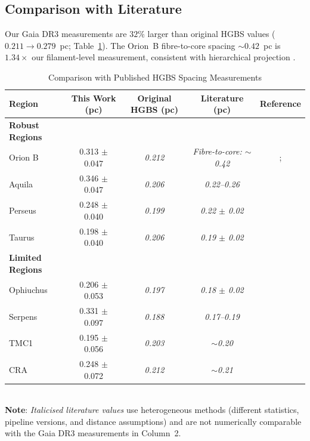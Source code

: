 \documentclass[twoside,twocolumn]{mnras}
\begin{document}
\subsection{Comparison with Literature}

Our Gaia DR3 measurements are $32\%$ larger than original HGBS values ($0.211 \to 0.279$~pc; Table~\ref{tab:literature}). The Orion~B fibre-to-core spacing ${\sim}0.42$~pc \citep{Yang2024} is $1.34\times$ our filament-level measurement, consistent with hierarchical projection \citep{Hacar2018}. 

\begin{table}
\caption{Comparison with Published HGBS Spacing Measurements}
\label{tab:literature}
\begin{tabular}{lcccc}
\toprule
Region & This Work (pc) & Original HGBS (pc) & Literature (pc) & Reference \\
\midrule
\textbf{Robust Regions} &  &  &  &  \\
Orion B & 0.313 $\pm$ 0.047 & \textit{0.212} & \textit{Fibre-to-core: ${\sim}$0.42} & \citet{Konyves2020}; \citet{Yang2024} \\
Aquila  & 0.346 $\pm$ 0.047 & \textit{0.206} & \textit{0.22--0.26} & \citet{Konyves2015} \\
Perseus & 0.248 $\pm$ 0.040 & \textit{0.199} & \textit{0.22 $\pm$ 0.02} & \citet{Andre2016} \\
Taurus  & 0.198 $\pm$ 0.040 & \textit{0.206} & \textit{0.19 $\pm$ 0.02} & \citet{Hacar2013} \\
\midrule
\textbf{Limited Regions} &  &  &  &  \\
Ophiuchus & 0.206 $\pm$ 0.053 & \textit{0.197} & \textit{0.18 $\pm$ 0.02} & \citet{Konyves2020} \\
Serpens  & 0.331 $\pm$ 0.097 & \textit{0.188} & \textit{0.17--0.19} & \citet{Konyves2020} \\
TMC1     & 0.195 $\pm$ 0.056 & \textit{0.203} & \textit{${\sim}$0.20} & \citet{Hacar2013} \\
CRA      & 0.248 $\pm$ 0.072 & \textit{0.212} & \textit{${\sim}$0.21} & \citet{Konyves2020} \\
\bottomrule
\end{tabular}
\\ \footnotesize \textbf{Note}: \textit{Italicised literature values} use heterogeneous methods (different statistics, pipeline versions, and distance assumptions) and are not numerically comparable with the Gaia DR3 measurements in Column~2.
\end{table}
\end{document}
